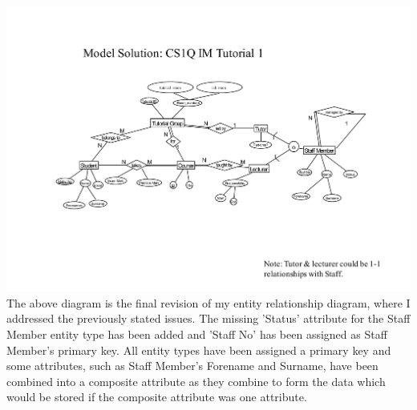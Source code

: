 \documentclass[12pt]{article}
\begin{document}
\includegraphics[width=\linewidth]{tut1_solution}
The above diagram is the final revision of my entity relationship diagram, where I addressed the previously stated issues.
The missing 'Status' attribute for the Staff Member entity type has been added and 'Staff No' has been assigned as Staff Member's primary key.
All entity types have been assigned a primary key and some attributes, such as Staff Member's Forename and Surname, have been combined into a composite attribute as they combine to form the data which would be stored if the composite attribute was one attribute.
\end{document}
